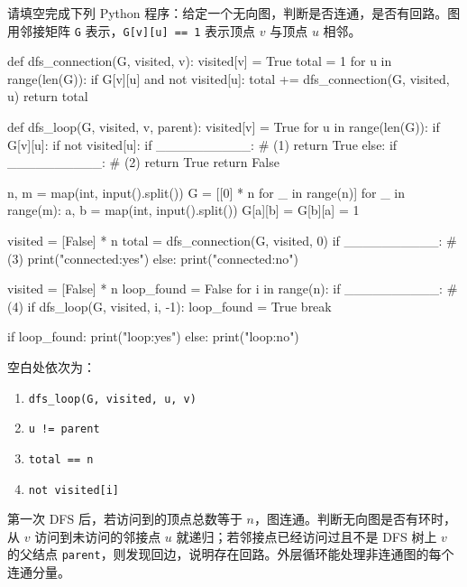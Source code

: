 \begin{question}[无向图连通性与回路判断]
请填空完成下列 Python 程序：给定一个无向图，判断是否连通，是否有回路。图用邻接矩阵 \texttt{G} 表示，\texttt{G[v][u] == 1} 表示顶点 $v$ 与顶点 $u$ 相邻。
\begin{pycode}
def dfs_connection(G, visited, v):
    visited[v] = True
    total = 1
    for u in range(len(G)):
        if G[v][u] and not visited[u]:
            total += dfs_connection(G, visited, u)
    return total


def dfs_loop(G, visited, v, parent):
    visited[v] = True
    for u in range(len(G)):
        if G[v][u]:
            if not visited[u]:
                if __________:                 # (1)
                    return True
            else:
                if __________:                 # (2)
                    return True
    return False

n, m = map(int, input().split())
G = [[0] * n for _ in range(n)]
for _ in range(m):
    a, b = map(int, input().split())
    G[a][b] = G[b][a] = 1

visited = [False] * n
total = dfs_connection(G, visited, 0)
if __________:                                 # (3)
    print("connected:yes")
else:
    print("connected:no")

visited = [False] * n
loop_found = False
for i in range(n):
    if __________:                             # (4)
        if dfs_loop(G, visited, i, -1):
            loop_found = True
            break

if loop_found:
    print("loop:yes")
else:
    print("loop:no")
\end{pycode}
\begin{solution}
空白处依次为：
\begin{enumerate}
  \item \texttt{dfs\_loop(G, visited, u, v)}
  \item \texttt{u != parent}
  \item \texttt{total == n}
  \item \texttt{not visited[i]}
\end{enumerate}
第一次 DFS 后，若访问到的顶点总数等于 $n$，图连通。判断无向图是否有环时，从 $v$ 访问到未访问的邻接点 $u$ 就递归；若邻接点已经访问过且不是 DFS 树上 $v$ 的父结点 \texttt{parent}，则发现回边，说明存在回路。外层循环能处理非连通图的每个连通分量。
\end{solution}
\end{question}
